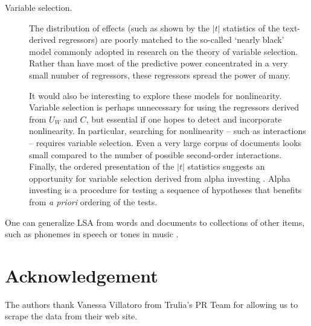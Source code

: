 \documentclass[10pt]{article}
\begin{document}
\begin{description}
   \item[Variable selection.]  The distribution of effects (such as shown by the $|t|$ statistics of the text-derived regressors) are poorly matched to the so-called `nearly black' model commonly adopted in research on the theory of variable selection.  Rather than have most of the predictive power concentrated in a very small number of regressors, these regressors spread the power of many.  
   
   It would also be interesting to explore these models for nonlinearity. Variable selection is perhaps unnecessary for using the regressors derived from $U_W$ and $C$, but essential if one hopes to detect and incorporate nonlinearity. In particular, searching for nonlinearity -- such as interactions -- requires variable selection.  Even a very large corpus of documents looks small compared to the number of possible second-order interactions.  Finally, the ordered presentation of the $|t|$ statistics suggests an opportunity for variable selection derived from alpha investing \citep{fosterstine08}.  Alpha investing is a procedure for testing a sequence of hypotheses that benefits from {\it a priori} ordering of the tests.
   
   \end{description}

One can generalize LSA from words and documents to collections of other items,
 such as phonemes in speech or tones in music \cite[called latent semantic
 mappingin][]{bellegarda05}.



\section*{Acknowledgement}

The authors thank Vanessa Villatoro from Trulia's PR Team for allowing us to scrape the data from their web site.





\end{document}
